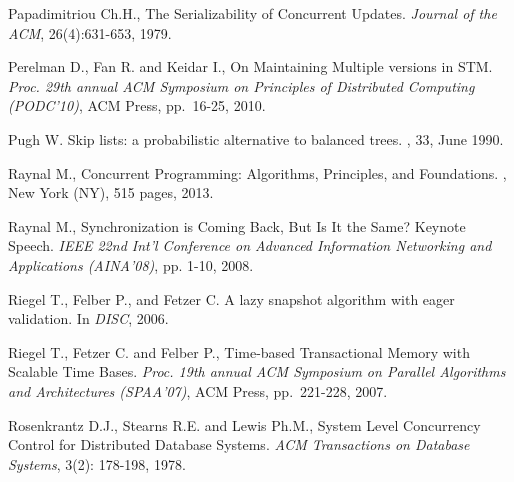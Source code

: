 \begin{thebibliography}{99}
{
Papadimitriou Ch.H., 
The Serializability of Concurrent Updates. 
{\it Journal of the ACM},  26(4):631-653, 1979. 





Perelman D., Fan R. and Keidar I., 
On Maintaining Multiple versions in STM. 
{\em  Proc.   29th  annual  ACM    Symposium  on Principles  of Distributed
Computing (PODC'10)}, ACM Press, pp.~16-25, 2010. 



Pugh W.
\newblock Skip lists: a probabilistic alternative to balanced trees.
, 33, June 1990.




Raynal  M.,
\newblock Concurrent Programming: Algorithms, Principles, and Foundations.
, New York (NY), 515 pages, 2013.

Raynal  M.,
Synchronization is Coming Back, But Is It the Same?
Keynote Speech. {\it  IEEE 22nd Int'l Conference on Advanced 
Information  Networking and Applications (AINA'08)},  pp. 1-10, 2008. 




Riegel T., Felber P., and Fetzer C.
\newblock A lazy snapshot algorithm with eager validation.
\newblock In {\em DISC}, 2006.


Riegel T., Fetzer C. and Felber P.,
Time-based Transactional Memory with Scalable Time Bases.
{\em  Proc.   19th  annual  ACM   Symposium  on  Parallel   Algorithms  and
Architectures (SPAA'07)}, ACM Press, pp.~221-228, 2007.



Rosenkrantz D.J.,  Stearns R.E. and Lewis Ph.M., 
System Level Concurrency Control for Distributed Database Systems.
{\it  ACM Transactions on  Database Systems},  3(2): 178-198, 1978.



}
\end{thebibliography}

